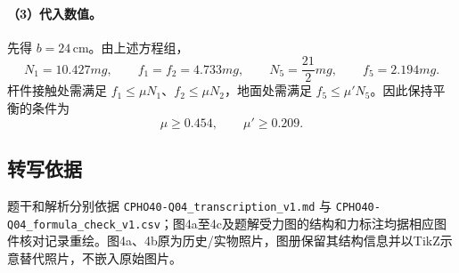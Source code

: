 \paragraph{（3）代入数值。}先得 $b=24\,\mathrm{cm}$。由上述方程组，
\[N_1=10.427mg,\qquad f_1=f_2=4.733mg,\qquad N_5=\frac{21}{2}mg,\qquad f_5=2.194mg.\]
杆件接触处需满足 $f_1\leq\mu N_1$、$f_2\leq\mu N_2$，地面处需满足 $f_5\leq\mu'N_5$。因此保持平衡的条件为
\[\mu\geq0.454,\qquad \mu'\geq0.209.\]
\subsection{转写依据}
题干和解析分别依据 \texttt{CPHO40-Q04\_transcription\_v1.md} 与 \texttt{CPHO40-Q04\_formula\_check\_v1.csv}；图4a至4c及题解受力图的结构和力标注均据相应图件核对记录重绘。图4a、4b原为历史/实物照片，图册保留其结构信息并以TikZ示意替代照片，不嵌入原始图片。
